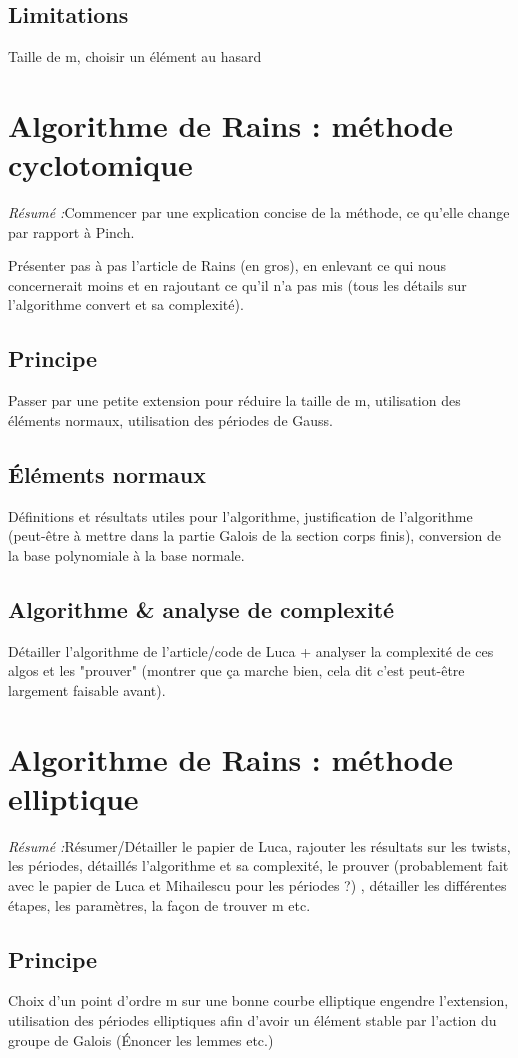 \documentclass[a4paper]{article} %
\numberwithin{section}{part}
\numberwithin{equation}{section}
\begin{document}
\subsection{Limitations}
Taille de m, choisir un élément au hasard

\section{Algorithme de Rains : méthode cyclotomique}
\textit{Résumé :}Commencer par une explication concise de la méthode, ce 
qu'elle change par rapport à Pinch.\par
Présenter pas à pas l'article de Rains (en gros), en enlevant ce qui nous 
concernerait moins et en rajoutant ce qu'il n'a pas mis (tous les détails 
sur l'algorithme convert et sa complexité).
\subsection{Principe}
Passer par une petite extension pour réduire la taille de m, utilisation des
éléments normaux, utilisation des périodes de Gauss.
\subsection{Éléments normaux}
Définitions et résultats utiles pour l'algorithme, justification de
l'algorithme (peut-être à mettre dans la partie Galois de la section corps
finis), conversion de la base polynomiale à la base normale.
\subsection{Algorithme \& analyse de complexité}
Détailler l'algorithme de l'article/code de Luca + analyser la complexité de ces
algos et les "prouver" (montrer que ça marche bien, cela dit c'est peut-être
largement faisable avant).

\section{Algorithme de Rains : méthode elliptique}
\textit{Résumé :}Résumer/Détailler le papier de Luca, rajouter les résultats sur
les twists, les périodes, détaillés l'algorithme et sa complexité, le prouver 
(probablement fait avec le papier de Luca et Mihailescu pour les périodes ?)
, détailler les différentes étapes, les paramètres, la façon de trouver m 
etc.
\subsection{Principe}
Choix d'un point d'ordre m sur une bonne courbe elliptique engendre 
l'extension, utilisation des périodes elliptiques afin d'avoir un élément 
stable par l'action du groupe de Galois (Énoncer les lemmes etc.)
\end{document}
